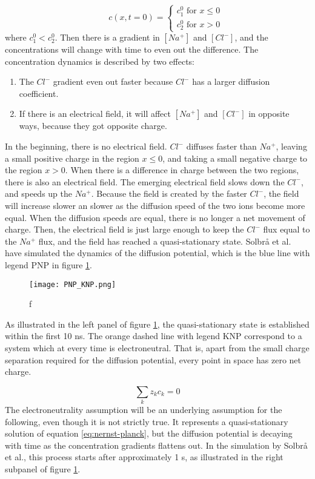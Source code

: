 \documentclass{article}
\begin{document}
\begin{equation}
 \qquad c\left(x,t=0\right) = \begin{cases}
  c_1^0 \text{ for } x \leq 0 \\
  c_2^0 \text{ for } x>0 
  \end{cases}
  \label{eq:step_function }
\end{equation}
where $c_1^0<c_2^0$. Then there is a gradient in $[Na^+]$ and $[Cl^-]$, and the concentrations will change with time to even out the difference. The concentration dynamics is described by two effects:
\begin{enumerate}
\item The $Cl^-$ gradient even out faster because $Cl^-$ has a larger diffusion coefficient. 
\item If there is an electrical field, it will affect  $[Na^+]$ and $[Cl^-]$ in opposite ways, because they got opposite charge.
\end{enumerate}
In the beginning, there is no electrical field. $Cl^-$ diffuses faster than $Na^+$, leaving a small positive charge in the region $x\leq 0$, and taking a small negative charge to the region $x>0$. When there is a difference in charge between the two regions, there is also an electrical field. The emerging electrical field slows down the $Cl^-$, and speeds up the $Na^+$. Because the field is created by the faster $Cl^-$, the field will increase slower an slower as the diffusion speed of the two ions become more equal. When the diffusion speeds are equal, there is no longer a net movement of charge. Then, the electrical field is just large enough to keep the $Cl^-$ flux equal to the $Na^+$ flux, and the field has reached a quasi-stationary state.  Solbr{\aa} et al.\cite{Solbraa} have simulated the dynamics of the diffusion potential, which is the blue line with legend PNP in figure \ref{fig:PNP_KNP}.  

\begin{figure}
  \texttt{[image: PNP\_KNP.png]}
  \caption{f}
  \label{fig:PNP_KNP}
\end{figure}
As illustrated in the left panel of figure \ref{fig:PNP_KNP}, the quasi-stationary state is established within the first 10 ns. The orange dashed line with legend KNP correspond to a system which at every time is electroneutral. That is, apart from the small charge separation required for the diffusion potential, every point in space has zero net charge. 

$$\sum _k z_k c_k =0$$
The electroneutrality assumption will be an underlying assumption for the following, even though it is not strictly true. It represents a quasi-stationary solution of equation \ref{eq:nernst-planck}, but the diffusion potential is decaying with time as the concentration gradients flattens out. In the simulation by Solbr{\aa} et al., this process starts after approximately 1 s, as illustrated in the right subpanel of figure \ref{fig:PNP_KNP}. 
\end{document}
